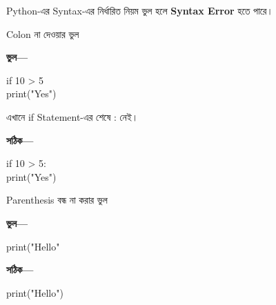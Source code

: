 

Python-এর Syntax-এর নির্ধারিত নিয়ম ভুল হলে
\textbf{Syntax Error} হতে পারে।

\begin{examplebox}{Colon না দেওয়ার ভুল}

\textbf{ভুল—}

\begin{codebox}

\begin{english}
\ttfamily
if 10 > 5\\
\hspace*{4mm}print("Yes")
\end{english}

\end{codebox}

এখানে
\textenglish{\ttfamily if}
Statement-এর শেষে
\textenglish{\ttfamily :}
নেই।

\textbf{সঠিক—}

\begin{codebox}

\begin{english}
\ttfamily
if 10 > 5:\\
\hspace*{4mm}print("Yes")
\end{english}

\end{codebox}

\end{examplebox}

\begin{examplebox}{Parenthesis বন্ধ না করার ভুল}

\textbf{ভুল—}

\begin{codebox}

\begin{english}
\ttfamily
print("Hello"
\end{english}

\end{codebox}

\textbf{সঠিক—}

\begin{codebox}

\begin{english}
\ttfamily
print("Hello")
\end{english}

\end{codebox}

\end{examplebox}

